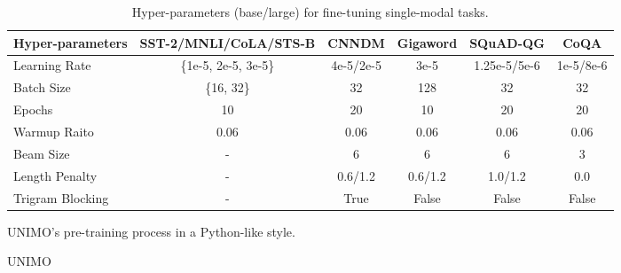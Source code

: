 \documentclass[11pt,a4paper]{article}
\begin{document}
\begin{table*}[t!]
\centering
\small
\begin{tabular}{l|c|c|c|c|c}
\hline
Hyper-parameters & SST-2/MNLI/CoLA/STS-B & CNNDM & Gigaword & SQuAD-QG & CoQA \\
\hline
Learning Rate & \{1e-5, 2e-5, 3e-5\} & 4e-5/2e-5 & 3e-5 & 1.25e-5/5e-6 & 1e-5/8e-6 \\
Batch Size & \{16, 32\} & 32 & 128 & 32 & 32 \\
Epochs & 10 & 20 & 10 & 20 & 20 \\
Warmup Raito & 0.06 & 0.06 & 0.06 & 0.06 & 0.06 \\
Beam Size & - & 6 & 6 & 6 & 3 \\
Length Penalty & - & 0.6/1.2 & 0.6/1.2 & 1.0/1.2 & 0.0 \\
Trigram Blocking & - &True & False & False & False \\
\hline
\end{tabular}
\caption{\label{gen-params}
Hyper-parameters (base/large) for fine-tuning single-modal tasks.}
\end{table*}




\begin{algorithm}[t!]  
	\caption{UNIMO's pre-training process in a Python-like style.}  
	\label{alg:cmcl-pseudocode} 
	\begin{algorithmic}
	\small{
\State {}
		\Function {}{}
		\State 
		\State {}
		\State 
		\State {}
		\State 
		\State {}
		\State 
		\State {}
		\State
		\State
		\EndFor
		\State
		\State
		\State UNIMO
		\State
		\State
		\EndFor
		\EndFunction
		
		\\
		\State {}
		\Function {}{}
		\State 
		\State {}
		\State
		\State {}
		\State
		\State {}
		\State
		\State {}
		\State
		\State 
		\State 
		\State 
		\State 
		\State 
		\\ \ \ \ \ \ \ \Return 
		\EndFunction
	}
	\end{algorithmic}  
\end{algorithm}
\end{document}
